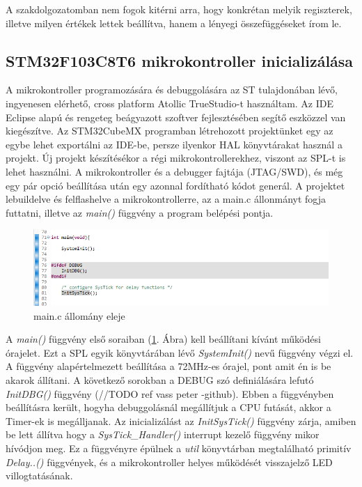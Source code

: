 \documentclass[../main.tex]{subfiles}
\begin{document}
        A szakdolgozatomban nem fogok kitérni arra, hogy konkrétan melyik regiszterek, illetve milyen értékek lettek beállítva, hanem a lényegi összefüggéseket írom le.
    
    \subsection{STM32F103C8T6 mikrokontroller inicializálása}
        A mikrokontroller programozására és debuggolására az ST tulajdonában lévő, ingyenesen elérhető, cross platform Atollic TrueStudio-t használtam. Az IDE Eclipse alapú és rengeteg beágyazott szoftver fejlesztésében segítő eszközzel van kiegészítve. Az STM32CubeMX programban létrehozott projektünket egy az egybe lehet exportálni az IDE-be, persze ilyenkor HAL könyvtárakat használ a projekt.
        Új projekt készítésékor a régi mikrokontrollerekhez, viszont az SPL-t is lehet használni. A mikrokontroller és a debugger fajtája (JTAG/SWD), és még egy pár opció beállítása után egy azonnal fordítható kódot generál.
        A projektet lebuildelve és felflashelve a mikrokontrollerre, az a main.c állonmányt fogja futtatni, illetve az \textit{main()} függvény a program belépési pontja.
        
        \begin{figure}[h!]
            \centering
                \includegraphics[width=13cm]{resources/mbed_res/ps_main_init.png}
                \caption{main.c állomány eleje}
                \label{fig:ps_main_init}
        \end{figure}
        
        A \textit{main()} függvény első soraiban (\ref{fig:ps_main_init}. Ábra) kell beállítani kívánt működési órajelet. Ezt a SPL egyik könyvtárában lévő \textit{SystemInit()} nevű függvény végzi el. A függvény alapértelmezett beállítása a 72MHz-es órajel, pont amit én is be akarok állítani. A következő sorokban a DEBUG szó definiálására lefutó \textit{InitDBG()} függvény (//TODO ref vass peter -github). Ebben a függvényben beállításra került, hogyha debuggolásnál megállítjuk a CPU futását, akkor a Timer-ek is megálljanak. Az inicializálást az \textit{InitSysTick()} függvény zárja, amiben be lett állítva hogy a \textit{SysTick_Handler()} interrupt kezelő függvény mikor hívódjon meg. Ez a függvényre épülnek a \textit{util} könyvtárban megtalálható primitív \textit{Delay..()} függvények, és a mikrokontroller helyes működését visszajelző LED villogtatásának.
       
\end{document}
